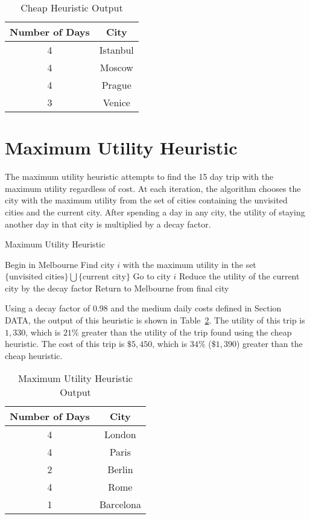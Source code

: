 \documentclass[12pt]{article}
\begin{document}
\begin{table}[ht!]
	\centering
	\begin{tabular}{| c || c |}
		\hline
		Number of Days & City \\ \hline \hline
		4 & Istanbul \\ \hline
		4 & Moscow \\ \hline
		4 & Prague \\ \hline
		3 & Venice \\ \hline
	\end{tabular}
	\caption{Cheap Heuristic Output}
	\label{cheap_heuristic_output}
\end{table}

\section{Maximum Utility Heuristic}

The maximum utility heuristic attempts to find the 15 day trip with the maximum utility regardless of cost. At each iteration, the algorithm chooses the city with the maximum utility from the set of cities containing the unvisited cities and the current city. After spending a day in any city, the utility of staying another day in that city is multiplied by a decay factor.

\begin{algorithm}[ht!]
\caption{Maximum Utility Heuristic}
\begin{algorithmic}
\STATE Begin in Melbourne
\STATE Find city $i$ with the maximum utility in the set $\{ \text{unvisited cities} \} \bigcup \{ \text{current city} \}$
\STATE Go to city $i$
\STATE Reduce the utility of the current city by the decay factor
\ENDFOR
\STATE Return to Melbourne from final city
\end{algorithmic}
\end{algorithm}

Using a decay factor of 0.98 and the medium daily costs defined in Section DATA, the output of this heuristic is shown in Table~\ref{max_utility_heuristic_output}. The utility of this trip is $1,330$, which is $21\%$ greater than the utility of the trip found using the cheap heuristic. The cost of this trip is $\$5,450$, which is $34\%$ ($\$1,390$) greater than the cheap heuristic.

\begin{table}[ht!]
	\centering
	\begin{tabular}{| c || c |}
		\hline
		Number of Days & City \\ \hline \hline
		4 & London \\ \hline
		4 & Paris \\ \hline
		2 & Berlin \\ \hline
		4 & Rome \\ \hline
		1 & Barcelona \\ \hline
	\end{tabular}
	\caption{Maximum Utility Heuristic Output}
	\label{max_utility_heuristic_output}
\end{table}
\end{document}

